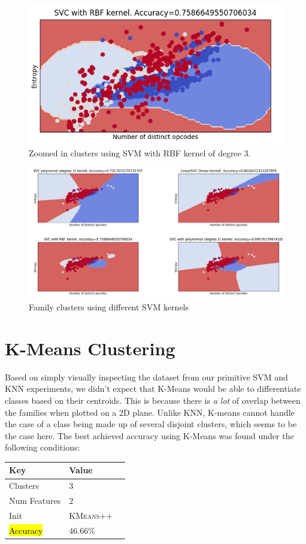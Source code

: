 \documentclass[12pt]{article}
\begin{document}
  \begin{figure}[H]
  \centering
  \includegraphics[height=.25\textheight ,width=.5\textwidth]{svmZoom.png}
  \caption{Zoomed in clusters using SVM with RBF kernel of degree 3.}
  \end{figure}
 
  \begin{figure}[H]
  \centering
  \includegraphics[height=.5\textheight ,width=1\textwidth]{svms.png}
  \caption{Family clusters using different SVM kernels}
  \end{figure}
  
\section{K-Means Clustering}
  Based on simply visually inspecting the dataset from our primitive SVM and KNN experiments, we didn't expect that K-Means would be able to differentiate classes based on their centroids. This is because there is \textit{a lot} of overlap between the families when plotted on a 2D plane. Unlike KNN, K-means cannot handle the case of a class being made up of several disjoint clusters, which seems to be the case here. The best achieved accuracy using K-Means was found under the following conditions:

  \begin{table}[H]
    \centering
  \begin{tabular}{|l|l|l|}
    \hline \textbf{Key} & \textbf{Value} \\\hline \hline
  Clusters            &        $ 3                    $\\\hline
  Num Features        &        $ 2                   $\\\hline       
  Init        &        \textsc{KMeans++} \\\hline       
  \hl{Accuracy}       &   $ 46.66\%$\\\hline 
  \end{tabular}
  \end{table}  
\end{document}
